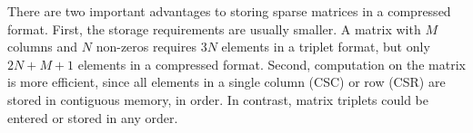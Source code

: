 There are two important advantages to storing sparse matrices in a
compressed format.  First, the storage requirements are usually smaller.  A
matrix with $M$ columns and $N$ non-zeros requires $3N$ elements in a
triplet format, but only $2N+M+1$ elements in a compressed format.
Second, computation on the matrix is more efficient, since all elements in a
single column (CSC) or row (CSR) are stored in contiguous memory, in
order.  In contrast, matrix triplets could be entered or stored in any
order.
